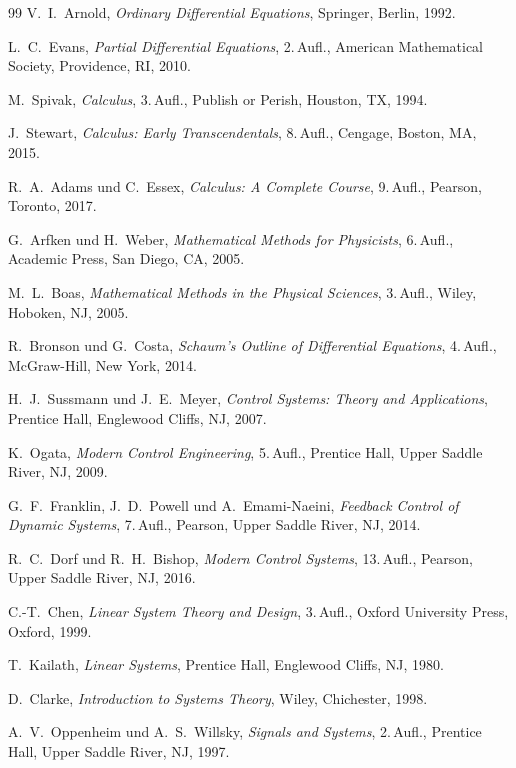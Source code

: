 \documentclass[a4paper,12pt,twoside]{report}
\theoremstyle{definition}
\begin{document}
\begin{thebibliography}{99}
	V.~I.~Arnold,
	\textit{Ordinary Differential Equations},
	Springer, Berlin, 1992.

	L.~C.~Evans,
	\textit{Partial Differential Equations},
	2.\,Aufl., American Mathematical Society, Providence, RI, 2010.

	M.~Spivak,
	\textit{Calculus},
	3.\,Aufl., Publish or Perish, Houston, TX, 1994.

	J.~Stewart,
	\textit{Calculus: Early Transcendentals},
	8.\,Aufl., Cengage, Boston, MA, 2015.

	R.~A.~Adams und C.~Essex,
	\textit{Calculus: A Complete Course},
	9.\,Aufl., Pearson, Toronto, 2017.

	G.~Arfken und H.~Weber,
	\textit{Mathematical Methods for Physicists},
	6.\,Aufl., Academic Press, San Diego, CA, 2005.

	M.~L.~Boas,
	\textit{Mathematical Methods in the Physical Sciences},
	3.\,Aufl., Wiley, Hoboken, NJ, 2005.

	R.~Bronson und G.~Costa,
	\textit{Schaum's Outline of Differential Equations},
	4.\,Aufl., McGraw-Hill, New York, 2014.

	H.~J.~Sussmann und J.~E.~Meyer,
	\textit{Control Systems: Theory and Applications},
	Prentice Hall, Englewood Cliffs, NJ, 2007.

	K.~Ogata,
	\textit{Modern Control Engineering},
	5.\,Aufl., Prentice Hall, Upper Saddle River, NJ, 2009.

	G.~F.~Franklin, J.~D.~Powell und A.~Emami-Naeini,
	\textit{Feedback Control of Dynamic Systems},
	7.\,Aufl., Pearson, Upper Saddle River, NJ, 2014.

	R.~C.~Dorf und R.~H.~Bishop,
	\textit{Modern Control Systems},
	13.\,Aufl., Pearson, Upper Saddle River, NJ, 2016.

	C.-T.~Chen,
	\textit{Linear System Theory and Design},
	3.\,Aufl., Oxford University Press, Oxford, 1999.

	T.~Kailath,
	\textit{Linear Systems},
	Prentice Hall, Englewood Cliffs, NJ, 1980.

	D.~Clarke,
	\textit{Introduction to Systems Theory},
	Wiley, Chichester, 1998.

	A.~V.~Oppenheim und A.~S.~Willsky,
	\textit{Signals and Systems},
	2.\,Aufl., Prentice Hall, Upper Saddle River, NJ, 1997.


\end{thebibliography}
\end{document}
